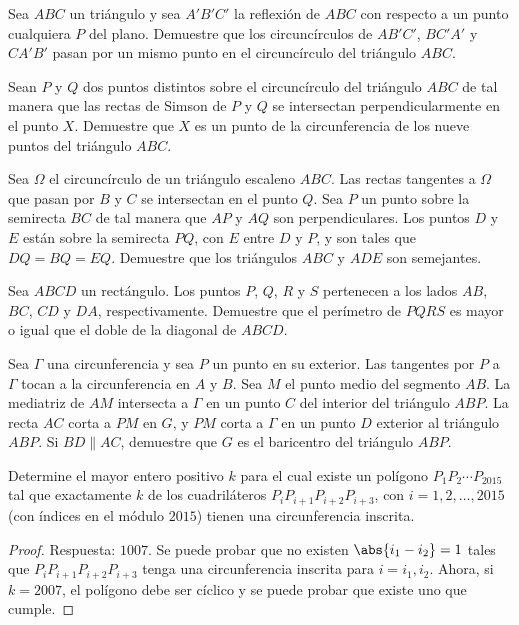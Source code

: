 \begin{probEG}
	Sea $ABC$ un triángulo y sea $A'B'C'$ la reflexión de $ABC$ con respecto a un punto cualquiera $P$ del plano. Demuestre que los circuncírculos de $AB'C'$, $BC'A'$ y $CA'B'$ pasan por un mismo punto en el circuncírculo del triángulo $ABC$.
\end{probEG}

\begin{probEG}
	Sean $P$ y $Q$ dos puntos distintos sobre el circuncírculo del triángulo $ABC$ de tal manera que las rectas de Simson de $P$ y $Q$ se intersectan perpendicularmente en el punto $X$. Demuestre que $X$ es un punto de la circunferencia de los nueve puntos del triángulo $ABC$.
\end{probEG}

\begin{probEG}
	Sea $\Omega$ el circuncírculo de un triángulo escaleno $ABC$. Las rectas tangentes a $\Omega$ que pasan por $B$ y $C$ se intersectan en el punto $Q$. Sea $P$ un punto sobre la semirecta $BC$ de tal manera que $AP$ y $AQ$ son perpendiculares. Los puntos $D$ y $E$ están sobre la semirecta $PQ$, con $E$ entre $D$ y $P$, y son tales que $DQ=BQ=EQ$. Demuestre que los triángulos $ABC$ y $ADE$ son semejantes.
\end{probEG}

\begin{probEG}
	Sea $ABCD$ un rectángulo. Los puntos $P$, $Q$, $R$ y $S$ pertenecen a los lados $AB$, $BC$, $CD$ y $DA$, respectivamente. Demuestre que el perímetro de $PQRS$ es mayor o igual que el doble de la diagonal de $ABCD$.
\end{probEG}

\begin{probEG}
	Sea $\Gamma$ una circunferencia y sea $P$ un punto en su exterior. Las tangentes por $P$ a $\Gamma$ tocan a la circunferencia en $A$ y $B$. Sea $M$ el punto medio del segmento $AB$. La mediatriz de $AM$ intersecta a $\Gamma$ en un punto $C$ del interior del triángulo $ABP$. La recta $AC$ corta a $PM$ en $G$, y $PM$ corta a $\Gamma$ en un punto $D$ exterior al triángulo $ABP$. Si $BD\parallel AC$, demuestre que $G$ es el baricentro del triángulo $ABP$.
\end{probEG}

\begin{probEG}
	Determine el mayor entero positivo $k$ para el cual existe un polígono $P_1P_2\cdots P_{2015}$ tal que exactamente $k$ de los cuadriláteros $P_iP_{i+1}P_{i+2}P_{i+3}$, con $i=1,2,\dots,2015$ (con índices en el módulo $2015$) tienen una circunferencia inscrita.
\end{probEG}

\begin{proof}
	Respuesta: $1007$. Se puede probar que no existen $\abs{i_1-i_2}=1$ tales que $P_iP_{i+1}P_{i+2}P_{i+3}$ tenga una circunferencia inscrita para $i=i_1,i_2$. Ahora, si $k=2007$, el polígono debe ser cíclico y se puede probar que existe uno que cumple.
\end{proof}
